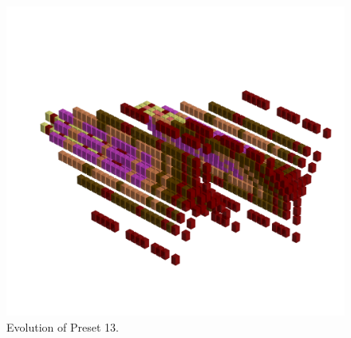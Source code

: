 \clearpage                                                                 
\begin{figure}[H]                                                          
  \centering                                                             
  \begin{adjustbox}{width=14cm,center}                                   
  \includegraphics[width=14cm]{src/presets/pattern13-45.png}%
  \end{adjustbox}                                                        
\caption{Evolution of Preset 13.}                                           
\end{figure}                                                               
\clearpage                                                                 
                                                                           
